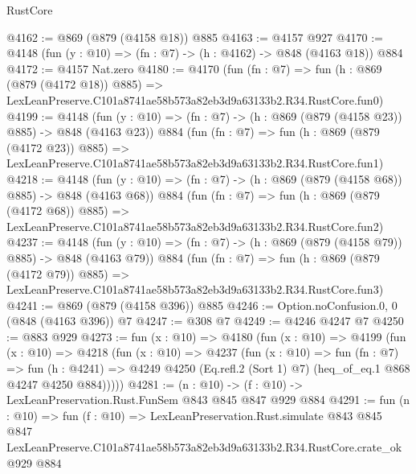 \begin{lexlean}{RustCore}
\begin{coremodule}
@4162 := @869 (@879 (@4158 @18)) @885
@4163 := @4157 @927
@4170 := @4148 (fun (y : @10) => (fn : @7) -> (h : @4162) -> @848 (@4163 @18)) @884
@4172 := @4157 Nat.zero
@4180 := @4170
    (fun (fn : @7) =>
    fun (h : @869 (@879 (@4172 @18)) @885) =>
    LexLeanPreserve.C101a8741ae58b573a82eb3d9a63133b2.R34.RustCore.fun0)
@4199 := @4148
    (fun (y : @10) => (fn : @7) -> (h : @869 (@879 (@4158 @23)) @885) -> @848 (@4163 @23))
    @884
    (fun (fn : @7) =>
    fun (h : @869 (@879 (@4172 @23)) @885) =>
    LexLeanPreserve.C101a8741ae58b573a82eb3d9a63133b2.R34.RustCore.fun1)
@4218 := @4148
    (fun (y : @10) => (fn : @7) -> (h : @869 (@879 (@4158 @68)) @885) -> @848 (@4163 @68))
    @884
    (fun (fn : @7) =>
    fun (h : @869 (@879 (@4172 @68)) @885) =>
    LexLeanPreserve.C101a8741ae58b573a82eb3d9a63133b2.R34.RustCore.fun2)
@4237 := @4148
    (fun (y : @10) => (fn : @7) -> (h : @869 (@879 (@4158 @79)) @885) -> @848 (@4163 @79))
    @884
    (fun (fn : @7) =>
    fun (h : @869 (@879 (@4172 @79)) @885) =>
    LexLeanPreserve.C101a8741ae58b573a82eb3d9a63133b2.R34.RustCore.fun3)
@4241 := @869 (@879 (@4158 @396)) @885
@4246 := Option.noConfusion.{0, 0} (@848 (@4163 @396)) @7
@4247 := @308 @7
@4249 := @4246 @4247 @7
@4250 := @883 @929
@4273 := fun (x : @10) =>
  @4180
    (fun (x : @10) =>
    @4199
      (fun (x : @10) =>
      @4218
        (fun (x : @10) =>
        @4237
          (fun (x : @10) =>
          fun (fn : @7) =>
          fun (h : @4241) =>
          @4249 @4250 (Eq.refl.{2} (Sort 1) @7) (heq_of_eq.{1} @868 @4247 @4250 @884)))))
@4281 := (n : @10) -> (f : @10) -> LexLeanPreservation.Rust.FunSem @843 @845 @847 @929 @884
@4291 := fun (n : @10) =>
  fun (f : @10) =>
  LexLeanPreservation.Rust.simulate
    @843
    @845
    @847
    LexLeanPreserve.C101a8741ae58b573a82eb3d9a63133b2.R34.RustCore.crate_ok
    @929
    @884
\end{coremodule}
\end{lexlean}
